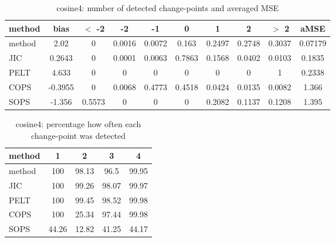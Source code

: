 \begin{table}[ht]
\centering
\begin{tabular}{l|c|ccccccc|c}
  \hline
method & bias & $<$ -2 & -2 & -1 & 0 & 1 & 2 & $>$ 2 & aMSE \\ 
  \hline
method &  2.02 &     0 & 0.0016 & 0.0072 & 0.163 & 0.2497 & 0.2748 & 0.3037 & 0.07179 \\ 
  JIC & 0.2643 &     0 & 0.0001 & 0.0063 & 0.7863 & 0.1568 & 0.0402 & 0.0103 & 0.1835 \\ 
  PELT & 4.633 &     0 &     0 &     0 &     0 &     0 &     0 &     1 & 0.2338 \\ 
  COPS & -0.3955 &     0 & 0.0068 & 0.4773 & 0.4518 & 0.0424 & 0.0135 & 0.0082 & 1.366 \\ 
  SOPS & -1.356 & 0.5573 &     0 &     0 &     0 & 0.2082 & 0.1137 & 0.1208 & 1.395 \\ 
   \hline
\end{tabular}
\caption{cosine4: number of detected change-points and averaged MSE} 
\label{tab:cosine4Njumps}
\end{table}
\begin{table}[ht]
\centering
\begin{tabular}{l|cccc}
  \hline
method & 1 & 2 & 3 & 4 \\ 
  \hline
method &    100 &  98.13 &   96.5 &  99.95 \\ 
  JIC &    100 &  99.26 &  98.07 &  99.97 \\ 
  PELT &    100 &  99.45 &  98.52 &  99.98 \\ 
  COPS &    100 &  25.34 &  97.44 &  99.98 \\ 
  SOPS &  44.26 &  12.82 &  41.25 &  44.17 \\ 
   \hline
\end{tabular}
\caption{cosine4: percentage how often each change-point was detected} 
\label{tab:cosine4Detections}
\end{table}
